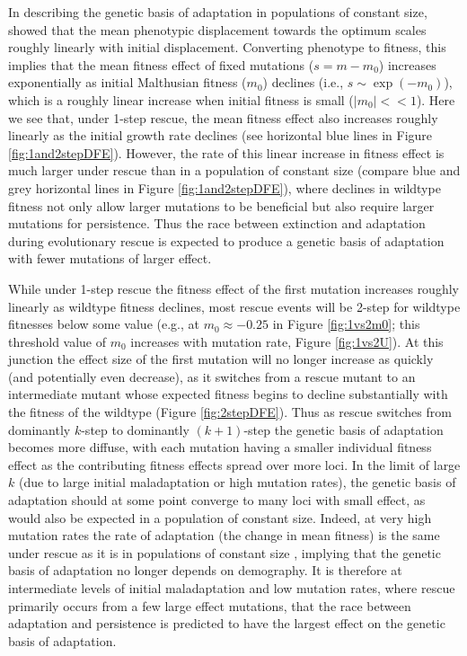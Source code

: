 \documentclass[9pt,twocolumn,twoside,lineno]{gsajnl}
\begin{document}
In describing the genetic basis of adaptation in populations of constant size, \cite{Orr1998} showed that the mean phenotypic displacement towards the optimum scales roughly linearly with initial displacement.
Converting phenotype to fitness, this implies that the mean fitness effect of fixed mutations ($s=m-m_0$) increases exponentially as initial Malthusian fitness ($m_0$) declines (i.e., $s \sim \exp(-m_0)$), which is a roughly linear increase when initial fitness is small ($|m_0|<<1$).
Here we see that, under 1-step rescue, the mean fitness effect also increases roughly linearly as the initial growth rate declines (see horizontal blue lines in Figure \ref{fig:1and2stepDFE}).
However, the rate of this linear increase in fitness effect is much larger under rescue than in a population of constant size (compare blue and grey horizontal lines in Figure \ref{fig:1and2stepDFE}), where declines in wildtype fitness not only allow larger mutations to be beneficial but also require larger mutations for persistence.
Thus the race between extinction and adaptation during evolutionary rescue is expected to produce a genetic basis of adaptation with fewer mutations of larger effect.

While under 1-step rescue the fitness effect of the first mutation increases roughly linearly as wildtype fitness declines, most rescue events will be 2-step for wildtype fitnesses below some value (e.g., at $m_0 \approx -0.25$ in Figure \ref{fig:1vs2m0}; this threshold value of $m_0$ increases with mutation rate, Figure \ref{fig:1vs2U}).
At this junction the effect size of the first mutation will no longer increase as quickly (and potentially even decrease), as it switches from a rescue mutant to an intermediate mutant whose expected fitness begins to decline substantially with the fitness of the wildtype (Figure \ref{fig:2stepDFE}).
Thus as rescue switches from dominantly $k$-step to dominantly $(k+1)$-step the genetic basis of adaptation becomes more diffuse, with each mutation having a smaller individual fitness effect as the contributing fitness effects spread over more loci.
In the limit of large $k$ (due to large initial maladaptation or high mutation rates), the genetic basis of adaptation should at some point converge to many loci with small effect, as would also be expected in a population of constant size.
Indeed, at very high mutation rates the rate of adaptation (the change in mean fitness) is the same under rescue as it is in populations of constant size \citep{anciaux2019population}, implying that the genetic basis of adaptation no longer depends on demography.
It is therefore at intermediate levels of initial maladaptation and low mutation rates, where rescue primarily occurs from a few large effect mutations, that the race between adaptation and persistence is predicted to have the largest effect on the genetic basis of adaptation.
\end{document}
